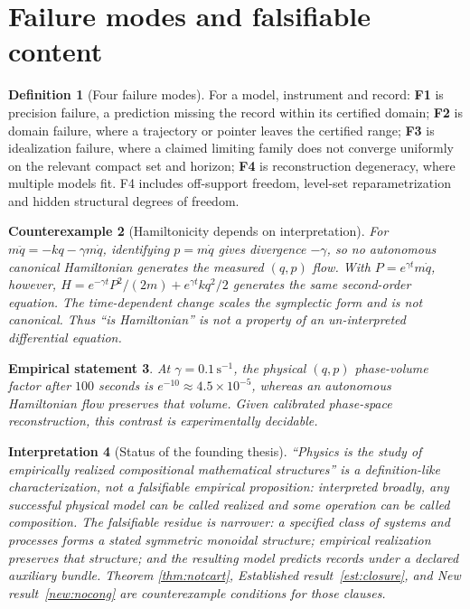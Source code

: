 \documentclass[12pt,a4paper]{article}
\theoremstyle{definition}
\newtheorem{definition}{Definition}[section]
\theoremstyle{plain}
\theoremstyle{commentary}
\newtheorem{interpretation}[definition]{Interpretation}
\newtheorem{empirical}[definition]{Empirical statement}
\newtheorem{counterexample}[definition]{Counterexample}
\begin{document}
\section{Failure modes and falsifiable content}

\begin{definition}[Four failure modes]\label{def:fail}
For a model, instrument and record: \textbf{F1} is precision failure, a prediction missing the
record within its certified domain; \textbf{F2} is domain failure, where a trajectory or pointer
leaves the certified range; \textbf{F3} is idealization failure, where a claimed limiting family
does not converge uniformly on the relevant compact set and horizon; \textbf{F4} is
reconstruction degeneracy, where multiple models fit.  F4 includes off-support freedom,
level-set reparametrization and hidden structural degrees of freedom.
\end{definition}

\begin{counterexample}[Hamiltonicity depends on interpretation]\label{cex:damped}
For $m\ddot q=-kq-\gamma m\dot q$, identifying $p=m\dot q$ gives divergence $-\gamma$, so
no autonomous canonical Hamiltonian generates the measured $(q,p)$ flow.  With
$P=e^{\gamma t}m\dot q$, however,
$H=e^{-\gamma t}P^2/(2m)+e^{\gamma t}kq^2/2$ generates the same second-order equation.  The
time-dependent change scales the symplectic form and is not canonical.  Thus ``is Hamiltonian''
is not a property of an un-interpreted differential equation.
\end{counterexample}

\begin{empirical}
At $\gamma=0.1\,\mathrm{s}^{-1}$, the physical $(q,p)$ phase-volume factor after $100$ seconds
is $e^{-10}\approx4.5\times10^{-5}$, whereas an autonomous Hamiltonian flow preserves that
volume.  Given calibrated phase-space reconstruction, this contrast is experimentally decidable.
\end{empirical}

\begin{interpretation}[Status of the founding thesis]\label{int:status}
``Physics is the study of empirically realized compositional mathematical structures'' is a
definition-like characterization, not a falsifiable empirical proposition: interpreted broadly,
any successful physical model can be called realized and some operation can be called
composition.  The falsifiable residue is narrower: a specified class of systems and processes
forms a stated symmetric monoidal structure; empirical realization preserves that structure;
and the resulting model predicts records under a declared auxiliary bundle.  Theorem
\ref{thm:notcart}, Established result~\ref{est:closure}, and New result~\ref{new:nocong} are
counterexample conditions for those clauses.
\end{interpretation}
\end{document}
